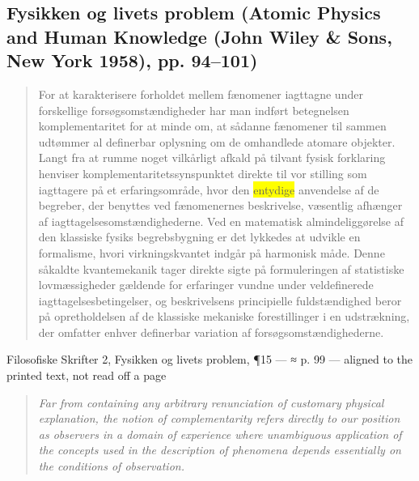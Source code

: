 \documentclass[11pt]{article}
\newcommand{\dcite}[1]{{\nopagebreak\raggedleft\small #1\par}\medskip}
\newcommand{\tlg}[1]{{\setlength{\fboxsep}{0.8pt}\colorbox{yellow}{#1}}}
\newcommand{\olg}[1]{{\setlength{\fboxsep}{0.8pt}\colorbox{cyan!25}{#1}}}
\begin{document}
\subsection{Fysikken og livets problem \normalfont(Atomic Physics and Human Knowledge (John Wiley \& Sons, New York 1958), pp. 94–101)}

\begin{quote}
For at karakterisere forholdet mellem fænomener iagttagne under forskellige forsøgsomstændigheder har man indført betegnelsen komplementaritet for at minde om, at sådanne fænomener til sammen udtømmer al definerbar oplysning om de omhandlede atomare objekter. Langt fra at rumme noget vilkårligt afkald på tilvant fysisk forklaring henviser komplementaritetssynspunktet direkte til vor stilling som iagttagere på et erfaringsområde, hvor den \tlg{entydige} anvendelse af de begreber, der benyttes ved fænomenernes beskrivelse, væsentlig afhænger af iagttagelsesomstændighederne. Ved en matematisk almindeliggørelse af den klassiske fysiks begrebsbygning er det lykkedes at udvikle en formalisme, hvori virkningskvantet indgår på harmonisk måde. Denne såkaldte kvantemekanik tager direkte sigte på formuleringen af statistiske lovmæssigheder gældende for erfaringer vundne under veldefinerede iagttagelsesbetingelser, og beskrivelsens principielle fuldstændighed beror på opretholdelsen af de klassiske mekaniske forestillinger i en udstrækning, der omfatter enhver definerbar variation af forsøgsomstændighederne.
\end{quote}
\dcite{Filosofiske Skrifter 2, Fysikken og livets problem, ¶15 — ≈ p. 99 — aligned to the printed text, not read off a page}
{\footnotesize\begin{quote}\itshape
Far from containing any arbitrary renunciation of customary physical explanation, the notion of complementarity refers directly to our position as observers in a domain of experience where \olg{unambiguous} application of the concepts used in the description of phenomena depends essentially on the conditions of observation.
\end{quote}}
\end{document}

